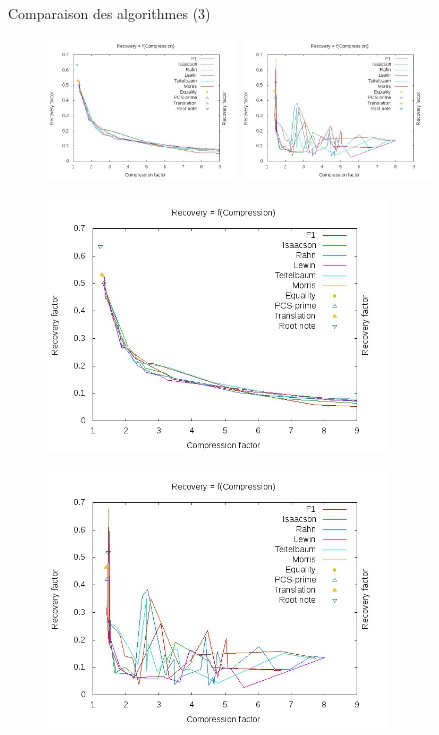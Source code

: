 \documentclass[10pt]{beamer}
\begin{document}
\begin{frame}{Comparaison des algorithmes (3)}
 {
\begin{figure}
\centering
\includegraphics[width = 5cm]{images/RfC77.jpg} \hspace{0.5cm}
\includegraphics[width = 5cm]{images/RfCDiag.jpg}
\end{figure}}

 {
\begin{figure}
\centering
\includegraphics[width = 9cm]{images/RfC77.jpg}
\end{figure}}

 {
\begin{figure}
\centering
\includegraphics[width = 9cm]{images/RfCDiag.jpg}
\end{figure}}
\end{frame}
\end{document}
